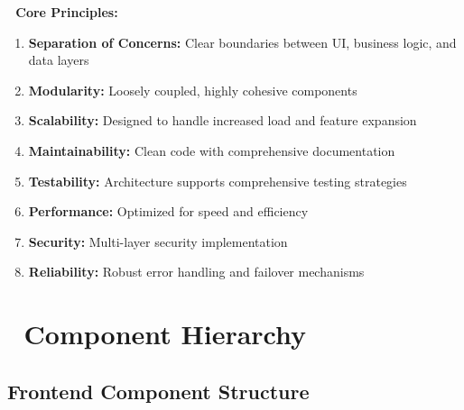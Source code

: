 \documentclass[11pt,a4paper]{article}
\begin{document}
\begin{tcolorbox}[colback=jupiterBlue!10,colframe=jupiterBlue]
\textbf{🎯 Core Principles:}
\begin{enumerate}
    \item \textbf{Separation of Concerns:} Clear boundaries between UI, business logic, and data layers
    \item \textbf{Modularity:} Loosely coupled, highly cohesive components
    \item \textbf{Scalability:} Designed to handle increased load and feature expansion
    \item \textbf{Maintainability:} Clean code with comprehensive documentation
    \item \textbf{Testability:} Architecture supports comprehensive testing strategies
    \item \textbf{Performance:} Optimized for speed and efficiency
    \item \textbf{Security:} Multi-layer security implementation
    \item \textbf{Reliability:} Robust error handling and failover mechanisms
\end{enumerate}
\end{tcolorbox}

\section{🧩 Component Hierarchy}

\subsection{Frontend Component Structure}
\end{document}
